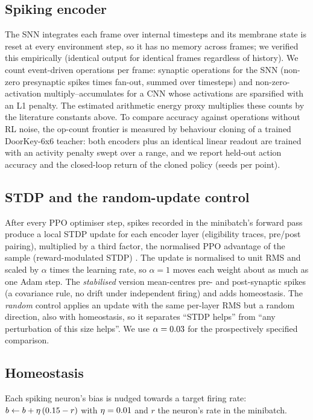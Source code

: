 \documentclass[10pt]{article}
\begin{document}
\subsection{Spiking encoder}
\label{sec:mech-snn}
The SNN integrates each frame over \snnT internal timesteps and its membrane state is reset at every environment
step, so it has no memory across frames; we verified this empirically (identical output for identical frames
regardless of history). We count event-driven operations per frame: synaptic operations for the SNN (non-zero
presynaptic spikes times fan-out, summed over timesteps) and non-zero-activation multiply--accumulates for a CNN
whose activations are sparsified with an L1 penalty. The estimated arithmetic energy proxy multiplies these counts by
the literature constants above. To compare accuracy against operations without RL noise, the op-count frontier is
measured by behaviour cloning of a trained DoorKey-6x6 teacher: both encoders plus an identical linear readout are
trained with an activity penalty swept over a range, and we report held-out action accuracy and the closed-loop
return of the cloned policy (\rqThreeSeeds seeds per point).

\subsection{STDP and the random-update control}
\label{sec:mech-stdp}
After every PPO optimiser step, spikes recorded in the minibatch's forward pass produce a local STDP update for each
encoder layer (eligibility traces, pre/post pairing), multiplied by a third factor, the normalised PPO advantage of
the sample (reward-modulated STDP) \citep{fremaux2016neuromodulated, lee2025brain}. The update is normalised to unit
RMS and scaled by $\alpha$ times the learning rate, so $\alpha=1$ moves each weight about as much as one Adam step.
The \emph{stabilised} version mean-centres pre- and post-synaptic spikes (a covariance rule, no drift under
independent firing) and adds homeostasis. The \emph{random} control applies an update with the same per-layer RMS
but a random direction, also with homeostasis, so it separates ``STDP helps'' from ``any perturbation of this size
helps''. We use $\alpha=0.03$ for the prospectively specified comparison.

\subsection{Homeostasis}
Each spiking neuron's bias is nudged towards a target firing rate: $b\leftarrow b+\eta\,(\text{0.15}-r)$ with
$\eta=0.01$ and $r$ the neuron's rate in the minibatch.
\end{document}
